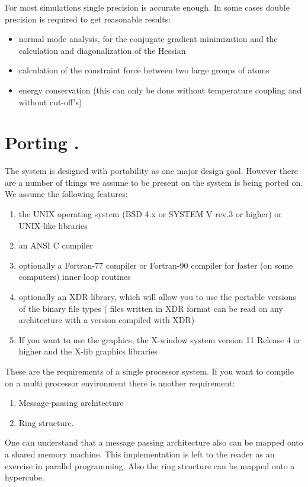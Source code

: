 For most simulations single precision is accurate enough.
In some cases double precision is required to get reasonable results:
\begin{itemize}
\item normal mode analysis,
for the conjugate gradient minimization and the calculation and
diagonalization of the Hessian
\item calculation of the constraint force between two large groups of atoms
\item energy conservation (this can only be done without temperature coupling
and without cut-off's)
\end{itemize}

\section{Porting {\gromacs}.}
The {\gromacs} system is designed with portability as one major design
goal. However there are a number of things we assume to be present on
the system {\gromacs} is being ported on. We assume the following
features:

\begin{enumerate}
\item 	the UNIX operating system (BSD 4.x or SYSTEM V rev.3 or higher) 
	or UNIX-like libraries
\item 	an ANSI C compiler 
\item	optionally a Fortran-77 compiler or Fortran-90 compiler
	for faster (on some computers) inner loop routines
\item	optionally an XDR library, which will allow you to use the
	portable versions of the {\gromacs} binary file types
	({\gromacs} files written in XDR format can be read on any
	architecture with a {\gromacs} version compiled with XDR)
\item 	If you want to use the graphics, the X-window system version 
	11 Release 4 or higher and the X-lib graphics libraries
\end{enumerate}

These are the requirements of a single processor system. If you want
to compile {\gromacs} on a multi processor environment there is another
requirement:

\begin{enumerate}
\item Message-passing architecture
\item Ring structure.
\end{enumerate}

One can understand that a message passing architecture also can be
mapped onto a shared memory machine. This implementation is left to
the reader as an exercise in parallel programming. Also the ring
structure can be mapped onto {\eg} a hypercube.

